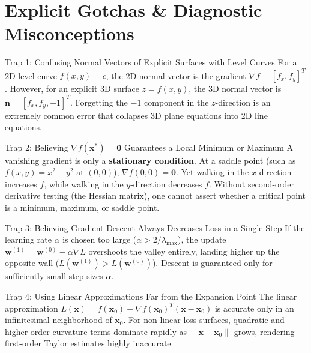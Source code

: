\section{Explicit Gotchas \& Diagnostic Misconceptions}

\begin{trapbox}{Trap 1: Confusing Normal Vectors of Explicit Surfaces with Level Curves}
For a 2D level curve $f(x, y) = c$, the 2D normal vector is the gradient $\nabla f = [f_x, f_y]^T$.
However, for an explicit 3D surface $z = f(x, y)$, the 3D normal vector is $\mathbf{n} = [f_x, f_y, -1]^T$. Forgetting the $-1$ component in the $z$-direction is an extremely common error that collapses 3D plane equations into 2D line equations.
\end{trapbox}

\begin{trapbox}{Trap 2: Believing $\nabla f(\mathbf{x}^*) = \mathbf{0}$ Guarantees a Local Minimum or Maximum}
A vanishing gradient is only a \textbf{stationary condition}. At a saddle point (such as $f(x, y) = x^2 - y^2$ at $(0, 0)$), $\nabla f(0, 0) = \mathbf{0}$. Yet walking in the $x$-direction increases $f$, while walking in the $y$-direction decreases $f$. Without second-order derivative testing (the Hessian matrix), one cannot assert whether a critical point is a minimum, maximum, or saddle point.
\end{trapbox}

\begin{trapbox}{Trap 3: Believing Gradient Descent Always Decreases Loss in a Single Step}
If the learning rate $\alpha$ is chosen too large ($\alpha > 2/\lambda_{\max}$), the update $\mathbf{w}^{(1)} = \mathbf{w}^{(0)} - \alpha \nabla L$ overshoots the valley entirely, landing higher up the opposite wall ($L(\mathbf{w}^{(1)}) > L(\mathbf{w}^{(0)})$). Descent is guaranteed only for sufficiently small step sizes $\alpha$.
\end{trapbox}

\begin{trapbox}{Trap 4: Using Linear Approximations Far from the Expansion Point}
The linear approximation $L(\mathbf{x}) = f(\mathbf{x}_0) + \nabla f(\mathbf{x}_0)^T(\mathbf{x} - \mathbf{x}_0)$ is accurate only in an infinitesimal neighborhood of $\mathbf{x}_0$. For non-linear loss surfaces, quadratic and higher-order curvature terms dominate rapidly as $\|\mathbf{x} - \mathbf{x}_0\|$ grows, rendering first-order Taylor estimates highly inaccurate.
\end{trapbox}

